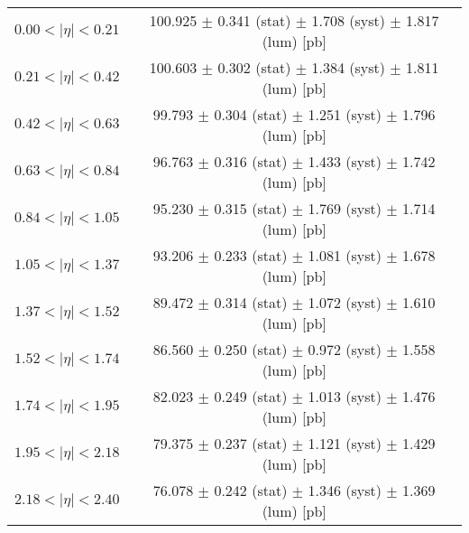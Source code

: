 \begin{tabular}{lc}
\hline
$0.00 < |\eta| <0.21$          & 100.925 $\pm$ 0.341 (stat) $\pm$ 1.708 (syst) $\pm$ 1.817 (lum) [pb]  \\
$0.21 < |\eta| <0.42$          & 100.603 $\pm$ 0.302 (stat) $\pm$ 1.384 (syst) $\pm$ 1.811 (lum) [pb]  \\
$0.42 < |\eta| <0.63$          & 99.793 $\pm$ 0.304 (stat) $\pm$ 1.251 (syst) $\pm$ 1.796 (lum) [pb]  \\
$0.63 < |\eta| <0.84$          & 96.763 $\pm$ 0.316 (stat) $\pm$ 1.433 (syst) $\pm$ 1.742 (lum) [pb]  \\
$0.84 < |\eta| <1.05$          & 95.230 $\pm$ 0.315 (stat) $\pm$ 1.769 (syst) $\pm$ 1.714 (lum) [pb]  \\
$1.05 < |\eta| <1.37$          & 93.206 $\pm$ 0.233 (stat) $\pm$ 1.081 (syst) $\pm$ 1.678 (lum) [pb]  \\
$1.37 < |\eta| <1.52$          & 89.472 $\pm$ 0.314 (stat) $\pm$ 1.072 (syst) $\pm$ 1.610 (lum) [pb]  \\
$1.52 < |\eta| <1.74$          & 86.560 $\pm$ 0.250 (stat) $\pm$ 0.972 (syst) $\pm$ 1.558 (lum) [pb]  \\
$1.74 < |\eta| <1.95$          & 82.023 $\pm$ 0.249 (stat) $\pm$ 1.013 (syst) $\pm$ 1.476 (lum) [pb]  \\
$1.95 < |\eta| <2.18$          & 79.375 $\pm$ 0.237 (stat) $\pm$ 1.121 (syst) $\pm$ 1.429 (lum) [pb]  \\
$2.18 < |\eta| <2.40$          & 76.078 $\pm$ 0.242 (stat) $\pm$ 1.346 (syst) $\pm$ 1.369 (lum) [pb]  \\
\hline
\end{tabular}
